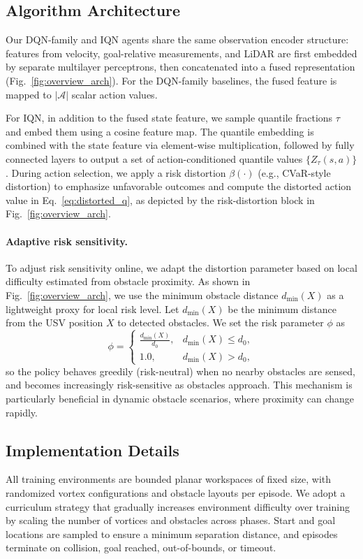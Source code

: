 \subsection{Algorithm Architecture}
\label{sec:method_arch}
Our DQN-family and IQN agents share the same observation encoder structure: features from velocity, goal-relative measurements, and LiDAR are first embedded by separate multilayer perceptrons, then concatenated into a fused representation (Fig.~\ref{fig:overview_arch}). For the DQN-family baselines, the fused feature is mapped to $|\mathcal{A}|$ scalar action values.

For IQN, in addition to the fused state feature, we sample quantile fractions $\tau$ and embed them using a cosine feature map. The quantile embedding is combined with the state feature via element-wise multiplication, followed by fully connected layers to output a set of action-conditioned quantile values $\{Z_{\tau}(s,a)\}$. During action selection, we apply a risk distortion $\beta(\cdot)$ (e.g., CVaR-style distortion) to emphasize unfavorable outcomes and compute the distorted action value in Eq.~\eqref{eq:distorted_q}, as depicted by the risk-distortion block in Fig.~\ref{fig:overview_arch}.

\paragraph{Adaptive risk sensitivity.}
To adjust risk sensitivity online, we adapt the distortion parameter based on local difficulty estimated from obstacle proximity. As shown in Fig.~\ref{fig:overview_arch}, we use the minimum obstacle distance $d_{\min}(X)$ as a lightweight proxy for local risk level. Let $d_{\min}(X)$ be the minimum distance from the USV position $X$ to detected obstacles. We set the risk parameter $\phi$ as
\begin{equation}
\phi =
\begin{cases}
\frac{d_{\min}(X)}{d_0}, & d_{\min}(X)\le d_0,\\
1.0, & d_{\min}(X)> d_0,
\end{cases}
\label{eq:adaptive_phi}
\end{equation}
so the policy behaves greedily (risk-neutral) when no nearby obstacles are sensed, and becomes increasingly risk-sensitive as obstacles approach. This mechanism is particularly beneficial in dynamic obstacle scenarios, where proximity can change rapidly.

\subsection{Implementation Details}
\label{sec:method_impl}
All training environments are bounded planar workspaces of fixed size, with randomized vortex configurations and obstacle layouts per episode. We adopt a curriculum strategy that gradually increases environment difficulty over training by scaling the number of vortices and obstacles across phases. Start and goal locations are sampled to ensure a minimum separation distance, and episodes terminate on collision, goal reached, out-of-bounds, or timeout.


